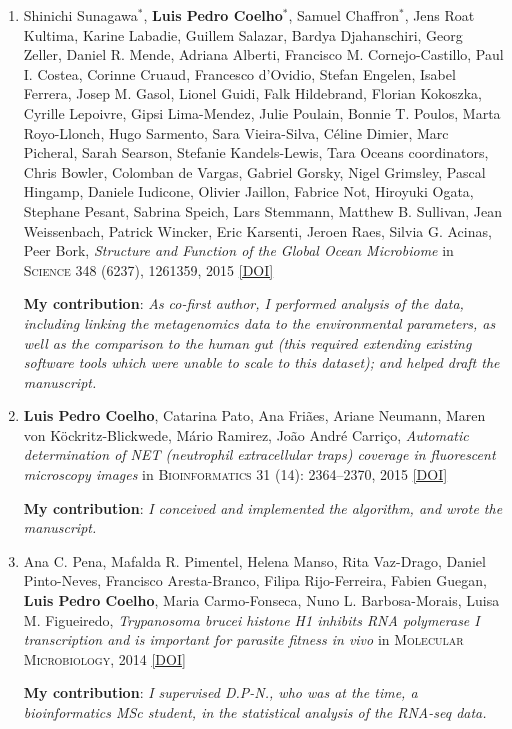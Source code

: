 \documentclass{article}
\newcommand\showdoi[1]{%
    \href{http://dx.doi.org/#1}{[DOI]}%
}
\newcommand\pubname[1]{\textsc{#1}}
\newcommand\contribution[1]{\relax\hfill\break\textbf{My contribution}: \textit{#1}}
\begin{document}
\begin{enumerate}[resume]
\item Shinichi Sunagawa${}^{*}$, \textbf{Luis Pedro Coelho}${}^{*}$, Samuel
Chaffron${}^{*}$, Jens Roat Kultima, Karine Labadie, Guillem Salazar, Bardya
Djahanschiri, Georg Zeller, Daniel R. Mende, Adriana Alberti, Francisco M.
Cornejo-Castillo, Paul I.  Costea, Corinne Cruaud, Francesco d'Ovidio, Stefan
Engelen, Isabel Ferrera, Josep M. Gasol, Lionel Guidi, Falk Hildebrand, Florian
Kokoszka, Cyrille Lepoivre, Gipsi Lima-Mendez, Julie Poulain, Bonnie T. Poulos,
Marta Royo-Llonch, Hugo Sarmento, Sara Vieira-Silva, Céline Dimier, Marc
Picheral, Sarah Searson, Stefanie Kandels-Lewis, Tara Oceans coordinators,
Chris Bowler, Colomban de Vargas, Gabriel Gorsky, Nigel Grimsley, Pascal
Hingamp, Daniele Iudicone, Olivier Jaillon, Fabrice Not, Hiroyuki Ogata,
Stephane Pesant, Sabrina Speich, Lars Stemmann, Matthew B. Sullivan, Jean
Weissenbach, Patrick Wincker, Eric Karsenti, Jeroen Raes, Silvia G. Acinas,
Peer Bork, \emph{Structure and Function of the Global Ocean Microbiome} in
\pubname{Science} 348 (6237), 1261359, 2015 \showdoi{10.1126/science.1261359}
\contribution{As co-first author, I performed analysis of the data, including
linking the metagenomics data to the environmental parameters, as well as the
comparison to the human gut (this required extending existing software tools
which were unable to scale to this dataset); and helped draft the manuscript.}

\item \textbf{Luis Pedro Coelho}, Catarina Pato, Ana Friães, Ariane Neumann,
Maren von Köckritz-Blickwede, Mário Ramirez, João André Carriço,
\emph{Automatic determination of NET (neutrophil extracellular traps) coverage
in fluorescent microscopy images} in \pubname{Bioinformatics} 31 (14):
2364--2370, 2015 \showdoi{10.1093/bioinformatics/btv156}
\contribution{I conceived and implemented the algorithm, and wrote the
manuscript.}

\item Ana C. Pena, Mafalda R. Pimentel, Helena Manso, Rita Vaz-Drago, Daniel
Pinto-Neves, Francisco Aresta-Branco, Filipa Rijo-Ferreira, Fabien Guegan,
\textbf{Luis Pedro Coelho}, Maria Carmo-Fonseca, Nuno L. Barbosa-Morais, Luisa
M. Figueiredo, \emph{Trypanosoma brucei histone H1 inhibits RNA polymerase I
transcription and is important for parasite fitness in vivo} in
\pubname{Molecular Microbiology}, 2014 \showdoi{10.1111/mmi.12677}
\contribution{I supervised D.P-N., who was at the time, a bioinformatics MSc
student, in the statistical analysis of the RNA-seq data.}


\end{enumerate}
\end{document}
